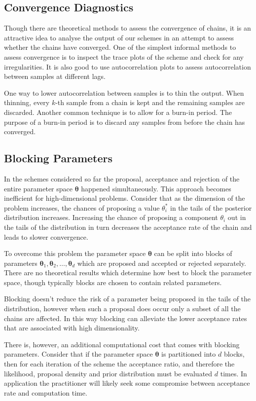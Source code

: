 \subsection*{Convergence Diagnostics}
\label{ssec:convergence_diagnostics}
Though there are theoretical methods to assess the convergence of chains, it is an attractive idea to analyse the output of our schemes in an attempt to assess whether the chains have converged. One of the simplest informal methods to assess convergence is to inspect the trace plots of the scheme and check for any irregularities. It is also good to use autocorrelation plots to assess autocorrelation between samples at different lags.

One way to lower autocorrelation between samples is to thin the output. When thinning, every $k$-th sample from a chain is kept and the remaining samples are discarded. Another common technique is to allow for a burn-in period. The purpose of a burn-in period is to discard any samples from before the chain has converged.

\subsection*{Blocking Parameters}
\label{ssec:blocking}
In the schemes considered so far the proposal, acceptance and rejection of the entire parameter space $\bm{\theta}$ happened simultaneously. This approach becomes inefficient for high-dimensional problems. Consider that as the dimension of the problem increases, the chances of proposing a value $\theta_i^*$ in the tails of the posterior distribution increases. Increasing the chance of proposing a component $\theta_i$ out in the tails of the distribution in turn decreases the acceptance rate of the chain and leads to slower convergence.

To overcome this problem the parameter space $\bm{\theta}$ can be split into blocks of parameters $\bm{\theta}_1, \bm{\theta}_2, \dots, \bm{\theta}_d$ which are proposed and accepted or rejected separately. There are no theoretical results which determine how best to block the parameter space, though typically blocks are chosen to contain related parameters.

Blocking doesn't reduce the risk of a parameter being proposed in the tails of the distribution, however when such a proposal does occur only a subset of all the chains are affected. In this way blocking can alleviate the lower acceptance rates that are associated with high dimensionality.

There is, however, an additional computational cost that comes with blocking parameters. Consider that if the parameter space $\bm{\theta}$ is partitioned into $d$ blocks, then for each iteration of the scheme the acceptance ratio, and therefore the likelihood, proposal density and prior distribution must be evaluated $d$ times. In application the practitioner will likely seek some compromise between acceptance rate and computation time.